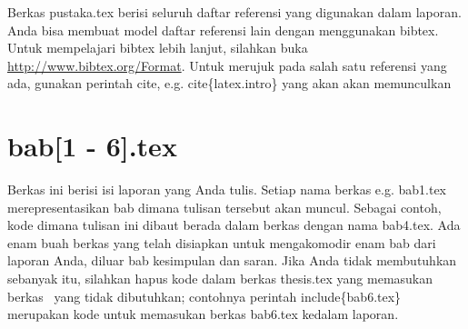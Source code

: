 Berkas pustaka.tex berisi seluruh daftar referensi yang digunakan dalam laporan. Anda bisa membuat model daftar referensi lain dengan menggunakan bibtex. Untuk mempelajari bibtex lebih lanjut, silahkan buka \url{http://www.bibtex.org/Format}. 
Untuk merujuk pada salah satu referensi yang ada, gunakan perintah \bslash cite, e.g. \bslash cite\{latex.intro\} yang akan akan memunculkan \cite{latex.intro}

\section{bab[1 - 6].tex}

Berkas ini berisi isi laporan yang Anda tulis. Setiap nama berkas e.g. bab1.tex merepresentasikan bab dimana tulisan tersebut akan muncul. Sebagai contoh, kode dimana tulisan ini dibaut berada dalam berkas dengan nama bab4.tex. Ada enam buah berkas yang telah disiapkan untuk mengakomodir enam bab dari laporan Anda, diluar bab kesimpulan dan saran. Jika Anda tidak membutuhkan sebanyak itu, silahkan hapus kode dalam berkas thesis.tex yang memasukan berkas \latex~yang tidak dibutuhkan;  contohnya perintah \bslash include\{bab6.tex\} merupakan kode untuk memasukan berkas bab6.tex kedalam laporan.